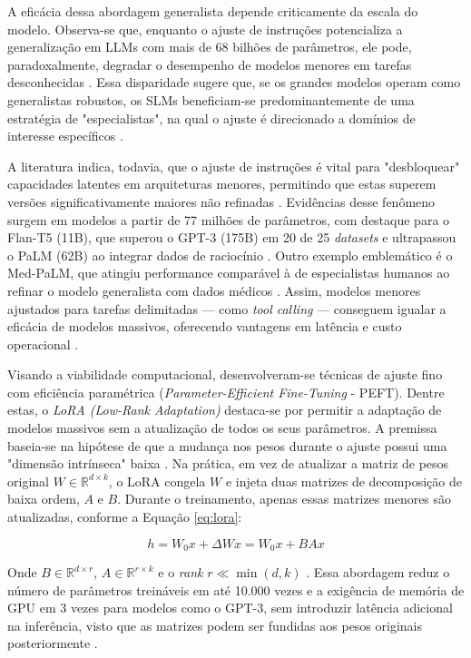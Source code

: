 \documentclass[
	12pt,				%
	openright,			%
	oneside,			%
	a4paper,			%
	dissertacao,			%
	]{ABNT-DC-UEL}
\begin{document}
A eficácia dessa abordagem generalista depende criticamente da escala do modelo. Observa-se que, enquanto o ajuste de instruções potencializa a generalização em LLMs com mais de 68 bilhões de parâmetros, ele pode, paradoxalmente, degradar o desempenho de modelos menores em tarefas desconhecidas \cite{wei2022finetune}. Essa disparidade sugere que, se os grandes modelos operam como generalistas robustos, os SLMs beneficiam-se predominantemente de uma estratégia de "especialistas", na qual o ajuste é direcionado a domínios de interesse específicos \cite{wei2022finetune}.

A literatura indica, todavia, que o ajuste de instruções é vital para "desbloquear" capacidades latentes em arquiteturas menores, permitindo que estas superem versões significativamente maiores não refinadas \cite{zhao2025}. Evidências desse fenômeno surgem em modelos a partir de 77 milhões de parâmetros, com destaque para o Flan-T5 (11B), que superou o GPT-3 (175B) em 20 de 25 \textit{datasets} e ultrapassou o PaLM (62B) ao integrar dados de raciocínio \cite{wei2022finetune, chung2024}. Outro exemplo emblemático é o Med-PaLM, que atingiu performance comparável à de especialistas humanos ao refinar o modelo generalista com dados médicos \cite{zhao2025}. Assim, modelos menores ajustados para tarefas delimitadas — como \textit{tool calling} — conseguem igualar a eficácia de modelos massivos, oferecendo vantagens em latência e custo operacional \cite{belcak2025}.

Visando a viabilidade computacional, desenvolveram-se técnicas de ajuste fino com eficiência paramétrica (\textit{Parameter-Efficient Fine-Tuning} - PEFT). Dentre estas, o \textit{LoRA (Low-Rank Adaptation)} destaca-se por permitir a adaptação de modelos massivos sem a atualização de todos os seus parâmetros. A premissa baseia-se na hipótese de que a mudança nos pesos durante o ajuste possui uma "dimensão intrínseca" baixa \cite{hu2022}. Na prática, em vez de atualizar a matriz de pesos original $W \in \mathbb{R}^{d \times k}$, o LoRA congela $W$ e injeta duas matrizes de decomposição de baixa ordem, $A$ e $B$. Durante o treinamento, apenas essas matrizes menores são atualizadas, conforme a Equação \ref{eq:lora}:

\begin{equation}\label{eq:lora}
  h = W_0x + \Delta Wx = W_0x + BAx
\end{equation}

Onde $B \in \mathbb{R}^{d \times r}$, $A \in \mathbb{R}^{r \times k}$ e o \textit{rank} $r \ll \min(d,k)$ \cite{hu2022}. Essa abordagem reduz o número de parâmetros treináveis em até 10.000 vezes e a exigência de memória de GPU em 3 vezes para modelos como o GPT-3, sem introduzir latência adicional na inferência, visto que as matrizes podem ser fundidas aos pesos originais posteriormente \cite{hu2022}.
\end{document}
